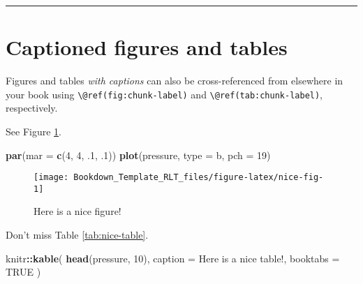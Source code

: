 \documentclass[
]{book}
\newenvironment{Shaded}{\begin{snugshade}}{\end{snugshade}}
\newcommand{\AttributeTok}[1]{\textcolor[rgb]{0.13,0.29,0.53}{#1}}
\newcommand{\ConstantTok}[1]{\textcolor[rgb]{0.56,0.35,0.01}{#1}}
\newcommand{\DecValTok}[1]{\textcolor[rgb]{0.00,0.00,0.81}{#1}}
\newcommand{\FunctionTok}[1]{\textcolor[rgb]{0.13,0.29,0.53}{\textbf{#1}}}
\newcommand{\NormalTok}[1]{#1}
\newcommand{\SpecialCharTok}[1]{\textcolor[rgb]{0.81,0.36,0.00}{\textbf{#1}}}
\newcommand{\StringTok}[1]{\textcolor[rgb]{0.31,0.60,0.02}{#1}}
\theoremstyle{definition}
\theoremstyle{definition}
\theoremstyle{definition}
\theoremstyle{definition}
\theoremstyle{remark}
\begin{document}
\begin{center}\rule{0.5\linewidth}{0.5pt}\end{center}

\hypertarget{captioned-figures-and-tables}{%
\section{Captioned figures and tables}\label{captioned-figures-and-tables}}

Figures and tables \emph{with captions} can also be cross-referenced from elsewhere in your book using \texttt{\textbackslash{}@ref(fig:chunk-label)} and \texttt{\textbackslash{}@ref(tab:chunk-label)}, respectively.

See Figure \ref{fig:nice-fig}.

\begin{Shaded}
\begin{Highlighting}[]
\FunctionTok{par}\NormalTok{(}\AttributeTok{mar =} \FunctionTok{c}\NormalTok{(}\DecValTok{4}\NormalTok{, }\DecValTok{4}\NormalTok{, .}\DecValTok{1}\NormalTok{, .}\DecValTok{1}\NormalTok{))}
\FunctionTok{plot}\NormalTok{(pressure, }\AttributeTok{type =} \StringTok{\textquotesingle{}b\textquotesingle{}}\NormalTok{, }\AttributeTok{pch =} \DecValTok{19}\NormalTok{)}
\end{Highlighting}
\end{Shaded}

\begin{figure}

{\centering \texttt{[image: Bookdown\_Template\_RLT\_files/figure-latex/nice-fig-1]} 

}

\caption{Here is a nice figure!}\label{fig:nice-fig}
\end{figure}

Don't miss Table \ref{tab:nice-table}.

\begin{Shaded}
\begin{Highlighting}[]
\NormalTok{knitr}\SpecialCharTok{::}\FunctionTok{kable}\NormalTok{(}
  \FunctionTok{head}\NormalTok{(pressure, }\DecValTok{10}\NormalTok{), }\AttributeTok{caption =} \StringTok{\textquotesingle{}Here is a nice table!\textquotesingle{}}\NormalTok{,}
  \AttributeTok{booktabs =} \ConstantTok{TRUE}
\NormalTok{)}
\end{Highlighting}
\end{Shaded}
\end{document}
